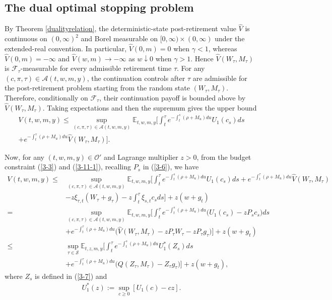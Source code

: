 \documentclass[a4paper,11pt]{amsart}
\numberwithin{equation}{section}
\newcommand{\blue}[1]{{\color{black}#1}}
\begin{document}
\subsection{The dual optimal stopping problem}

\blue{By Theorem \ref{dualityrelation}, the deterministic-state post-retirement value $\widehat V$ is continuous on $(0,\infty)^2$ and Borel measurable on $[0,\infty)\times(0,\infty)$ under the extended-real convention. In particular, $\widehat V(0,m)=0$ when $\gamma<1$, whereas $\widehat V(0,m)=-\infty$ and $\widehat V(w,m)\to-\infty$ as $w\downarrow0$ when $\gamma>1$. Hence $\widehat V(W_\tau,M_\tau)$ is $\mathcal F_\tau$-measurable for every admissible retirement time $\tau$.
 For any $(c,\pi,\tau)\in\mathcal A(t,w,m,y)$, the continuation controls after $\tau$ are admissible for the post-retirement problem starting from the random state $(W_\tau,M_\tau)$. Therefore, conditionally on $\mathcal F_\tau$, their continuation payoff is bounded above by $\widehat V(W_\tau,M_\tau)$. Taking expectations and then the supremum gives the upper bound}
\begin{align}\label{3-11-1}
V(t,w,m,y)\leq \sup_{(c,\pi,\tau) \in \mathcal{A}(t,w,m,y)} \mathbb{E}_{t,w,m,y} \bigg[ \int_t^{\tau}  e^{-\int^s_t (\rho+ M_u) du} U_1(c_s)  ds  \nonumber\\ +e^{-\int^{\tau}_t (\rho+ M_u) du}  \widehat{V}( W_{\tau},M_{\tau})    \bigg].
\end{align}

Now, for any $(t,w,m,y) \in \mathcal{O}'$ and Lagrange multiplier $z>0$, from the budget constraint (\ref{3-3}) and (\ref{3-11-1}), recalling $P_s$ in (\ref{3-6}), we have
\begin{align}\label{3-12}
V(t,w,m,y)
\leq&\sup_{(c,\pi,\tau)\in\mathcal A(t,w,m,y)}\mathbb E_{t,w,m,y}\bigg[\int_t^\tau e^{-\int_t^s(\rho+M_u)du}U_1(c_s)ds
+e^{-\int_t^\tau(\rho+M_u)du}\widehat V(W_\tau,M_\tau)\nonumber\\
&-z\xi_{\tau,t}(W_\tau+g_\tau)-z\int_t^\tau\xi_{s,t}c_sds\bigg]+z(w+g_t)\nonumber\\
=&\sup_{(c,\pi,\tau)\in\mathcal A(t,w,m,y)}\mathbb E_{t,w,m,y}\bigg[\int_t^\tau e^{-\int_t^s(\rho+M_u)du}\big(U_1(c_s)-zP_sc_s\big)ds\nonumber\\
&+e^{-\int_t^\tau(\rho+M_u)du}\big(\widehat V(W_\tau,M_\tau)-zP_\tau W_\tau-zP_\tau g_\tau\big)\bigg]+z(w+g_t)\nonumber\\
\leq&\sup_{\tau\in\mathcal S}\mathbb E_{t,z,m,y}\bigg[\int_t^\tau e^{-\int_t^s(\rho+M_u)du}U_1^\ast(Z_s)ds\nonumber\\
&+e^{-\int_t^\tau(\rho+M_u)du}\big(Q(Z_\tau,M_\tau)-Z_\tau g_\tau\big)\bigg]+z(w+g_t),
\end{align}
where $Z_s$ is defined in (\ref{3-7}) and 
\begin{align}\label{3-12-1}
{U}_1^\ast(z):= \sup_{c \geq 0}[U_1(c)-c z].
\end{align}
\end{document}
